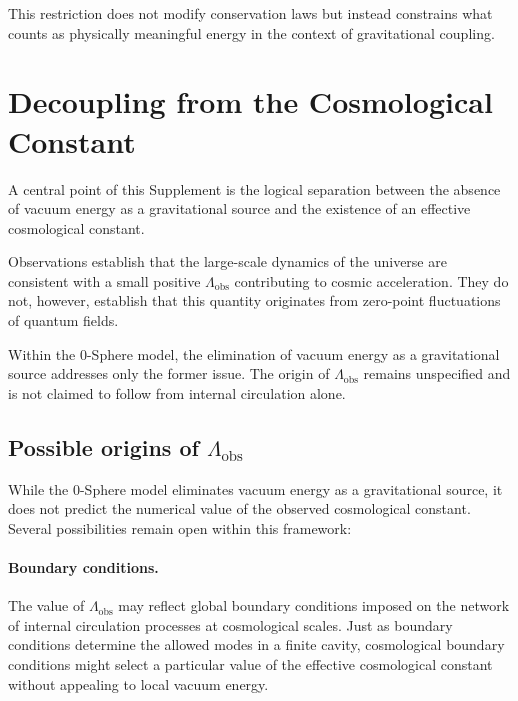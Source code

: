 \documentclass[12pt,letterpaper]{article}
\begin{document}
This restriction does not modify conservation laws but instead constrains what counts as physically meaningful energy in the context of gravitational coupling.


\section{Decoupling from the Cosmological Constant}

A central point of this Supplement is the logical separation between the absence of vacuum energy as a gravitational source and the existence of an effective cosmological constant.

Observations establish that the large-scale dynamics of the universe are consistent with a small positive $\Lambda_{\mathrm{obs}}$ contributing to cosmic acceleration. They do not, however, establish that this quantity originates from zero-point fluctuations of quantum fields.

Within the 0-Sphere model, the elimination of vacuum energy as a gravitational source addresses only the former issue. The origin of $\Lambda_{\mathrm{obs}}$ remains unspecified and is not claimed to follow from internal circulation alone.

\subsection{Possible origins of $\Lambda_{\mathrm{obs}}$}

While the 0-Sphere model eliminates vacuum energy as a gravitational source, it does not predict the numerical value of the observed cosmological constant. Several possibilities remain open within this framework:

\paragraph{Boundary conditions.}
The value of $\Lambda_{\mathrm{obs}}$ may reflect global boundary conditions imposed on the network of internal circulation processes at cosmological scales. Just as boundary conditions determine the allowed modes in a finite cavity, cosmological boundary conditions might select a particular value of the effective cosmological constant without appealing to local vacuum energy.
\end{document}
